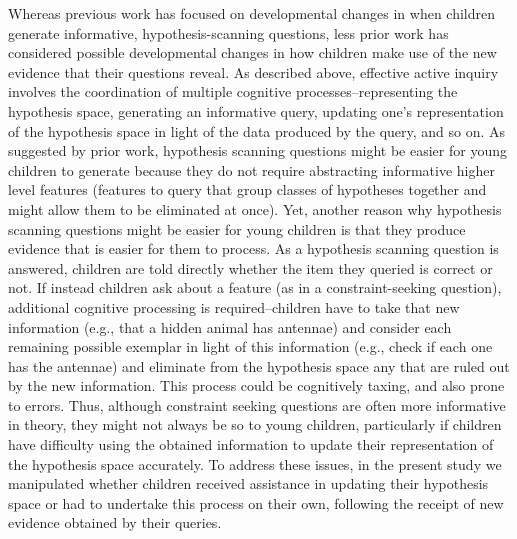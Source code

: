 \documentclass[10pt,letterpaper]{article}
\begin{document}
Whereas previous work has focused on developmental changes in when children generate informative, 
hypothesis-scanning questions, less prior work has considered possible developmental changes in how 
children make use of the new evidence that their questions reveal. As described above, effective active 
inquiry involves the coordination of multiple cognitive processes--representing the hypothesis space, 
generating an informative query, updating one's representation of the hypothesis space in light of the 
data produced by the query, and so on. As suggested by prior work, hypothesis scanning questions might 
be easier for young children to generate because they do not require abstracting informative higher level 
features (features to query that group classes of hypotheses together and might allow them to be eliminated 
at once). Yet, another reason why hypothesis scanning questions might be easier for young children is that they 
produce evidence that is easier for them to process. As a hypothesis scanning question is answered, children 
are told directly whether the item they queried is correct or not. If instead children ask about a feature (as 
in a constraint-seeking question), additional cognitive processing is required--children have to take that 
new information (e.g., that a hidden animal has antennae) and consider each remaining possible 
exemplar in light of this information (e.g., check if each one has the antennae) and eliminate from the 
hypothesis space any that are ruled out by the new information. This process could be cognitively taxing, 
and also prone to errors. Thus, although constraint seeking questions are often more informative in 
theory, they might not always be so to young children, particularly if children have difficulty using the 
obtained information to update their representation of the hypothesis space accurately. To address 
these issues, in the present study we manipulated whether children received assistance in updating 
their hypothesis space or had to undertake this process on their own, following the receipt of new 
evidence obtained by their queries. 


%
\end{document}
